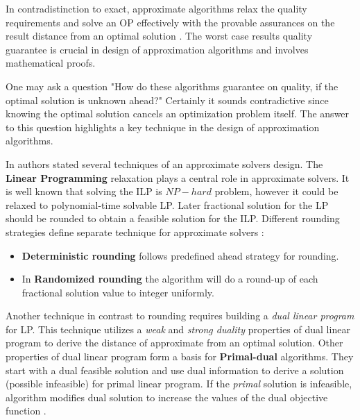 In contradistinction to exact, approximate algorithms relax the quality requirements and solve an OP effectively with the provable assurances on the result distance from an optimal solution \cite{williamson2011design}. The worst case results quality guarantee is crucial in design of approximation algorithms and involves mathematical proofs. 

One may ask a question "How do these algorithms guarantee on quality, if the optimal solution is unknown ahead?" Certainly it sounds contradictive since knowing the optimal solution cancels an optimization problem itself. The answer to this question highlights a key technique in the design of approximation algorithms.

In \cite{williamson2011design} authors stated several techniques of an approximate solvers design. The \textbf{Linear Programming} relaxation plays a central role in approximate solvers. It is well known that solving the ILP is $NP-hard$ problem, however it could be relaxed to polynomial-time solvable LP. %
Later fractional solution for the LP should be rounded to obtain a feasible solution for the ILP. %
Different rounding strategies define separate technique for approximate solvers \cite{williamson2011design}: 
\begin{itemize}
	\item \textbf{Deterministic rounding} follows predefined ahead strategy for rounding.
	\item In \textbf{Randomized rounding} the algorithm will do a round-up of each fractional solution value to integer uniformly.
\end{itemize}

Another technique in contrast to rounding requires building a \textit{dual linear program} for LP. This technique utilizes a \textit{weak} and \textit{strong duality} properties of dual linear program to derive the distance of approximate from an optimal solution. Other properties of dual linear program form a basis for \textbf{Primal-dual} algorithms. They start with a dual feasible solution and use dual information to derive a solution (possible infeasible) for primal linear program. If the \textit{primal} solution is infeasible, algorithm modifies dual solution to increase the values of the dual objective function \cite{williamson2011design}. 

